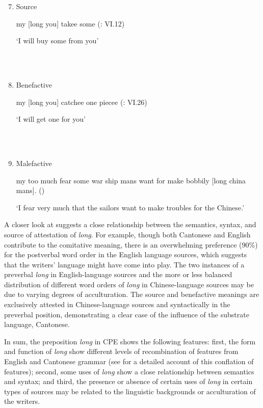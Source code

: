 \documentclass[output=paper]{langsci/langscibook}
\begin{document}
\ea%
    \label{ex:key:7}
    \begin{enumerate}
    \setcounter{enumi}{6}\renewcommand{\labelenumi}{$(\theenumi)$}
    \gll\\
        \\
    \glt
    \z

        \item  Source  

my [long you] takee some (\citealt{tong_chinese_1862}: VI.12)

‘I will buy some from you’

\ea%
    \label{ex:key:8}
    \gll\\
        \\
    \glt
    \z

        \item  Benefactive

  my [long you] catchee one piecee (\citealt{tong_chinese_1862}: VI.26)

‘I will get one for you’ 

\ea%
    \label{ex:key:9}
    \gll\\
        \\
    \glt
    \z

      \item    Malefactive

my too much fear some war ship mans want for make bobbily [long china mans]. (\citealt[968]{tilden_journal._1834})

‘I fear very much that the sailors want to make troubles for the Chinese.’
    \end{enumerate}
    
A closer look at  suggests a close relationship between the semantics, syntax, and source of attestation of \textit{long}. For example, though both Cantonese and English contribute to the comitative meaning, there is an overwhelming preference (90\%) for the postverbal word order in the English language sources, which suggests that the writers’ language might have come into play. The two instances of a preverbal \textit{long} in English-language sources and the more or less balanced distribution of different word orders of \textit{long} in Chinese-language sources may be due to varying degrees of acculturation. The source and benefactive meanings are exclusively attested in Chinese-language sources and syntactically in the preverbal position, demonstrating a clear case of the influence of the substrate language, Cantonese. 

In sum, the preposition \textit{long} in CPE shows the following features: first, the form and function of \textit{long} show different levels of recombination of features from English and Cantonese grammar (see \citealt{li_origins_2011} for a detailed account of this conflation of features); second, some uses of \textit{long} show a close relationship between semantics and syntax; and third, the presence or absence of certain uses of \textit{long} in certain types of sources may be related to the linguistic backgrounds or acculturation of the writers.
\end{document}
